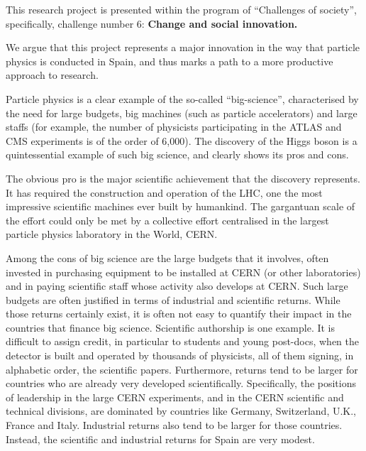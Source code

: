 %
This research project is presented within the program of ``Challenges of society'', specifically, challenge number 6: {\bf Change and social innovation.}

We argue that this project represents a major innovation in the way that particle physics is conducted in Spain, and thus marks a path to a more productive approach to research.

Particle physics is a clear example of the so-called ``big-science'',
characterised by the need for large budgets, big machines (such as particle accelerators) and large staffs (for example, the number of physicists participating in the ATLAS and CMS experiments is of the order of 6,000). The discovery of the Higgs boson is a quintessential example of such big science, and clearly shows its pros and cons. 

The obvious pro is the major scientific achievement that the discovery represents. It has required the construction and operation of the LHC, one the most impressive scientific machines ever built by humankind. The gargantuan scale of the effort could only be met by a collective effort centralised in the largest particle physics laboratory in the World, CERN.  

Among the cons of big science are the large budgets that it involves, often invested in purchasing equipment to be installed at CERN (or other laboratories) and in paying scientific staff whose activity also develops at CERN. Such large budgets are often justified in terms of industrial and scientific returns. While those returns certainly exist, it is often not easy to quantify their impact in the countries that finance big science. Scientific authorship is one example. It is difficult to assign credit, in particular to students and young post-docs, when the detector is built and operated by thousands of physicists, all of them signing, in alphabetic order, the scientific papers. Furthermore, returns tend to be larger for countries who are already very developed scientifically. Specifically, the positions of leadership in the large CERN experiments, and in the CERN scientific and technical divisions, are dominated by countries like Germany, Switzerland, U.K., France and Italy. Industrial returns also tend to be larger for those countries. Instead, the scientific and industrial returns for Spain are very modest. 

